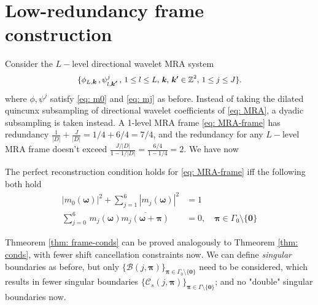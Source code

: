 \section{Low-redundancy frame construction}\label{sec: frame}
Consider the $L-$level directional wavelet MRA system
 \begin{align}\label{eq: MRA-frame}
 \{\phi_{L,\boldsymbol{k}}\,,\psi^j_{l,\boldsymbol{k'}}\,, \, {\small 1\leq l \leq L,\, \boldsymbol{k},\,\boldsymbol{k'}\in \mathbb{Z}^2,\,1\leq j \leq J\}}.
\end{align}  
where $\phi,\psi^j$ satisfy \eqref{eq: m0} and \eqref{eq: mj} as before. Instead of taking the dilated quincunx subsampling of directional wavelet coefficients of  \eqref{eq: MRA}, a dyadic subsampling is taken instead. A 1-level MRA frame \eqref{eq: MRA-frame} has redundancy $\frac{1}{|D|} + \frac{J}{|D|} = 1/4 + 6/4 = 7/4$, and the redundancy for any $L-$level MRA frame doesn't exceed $\frac{J/|D|}{1-1/|D|} = \frac{6/4}{1-1/4} = 2$. 
We have now
\begin{thm}\label{thm: frame-conds}
The perfect reconstruction condition holds for \eqref{eq: MRA-frame} iff the following both hold
\begin{align}
\textstyle |m_0(\boldsymbol{\omega})|^2 + \sum_{j = 1}^6|m_j(\boldsymbol{\omega})|^2 &= 1 \\
\textstyle\sum_{j = 0}^6\,m_j(\boldsymbol{\omega})\overline{m_j(\boldsymbol{\omega} + \boldsymbol{\pi})} &= 0,\quad  \boldsymbol{\pi}\in \Gamma_0\setminus\{\boldsymbol{0}\} \label{eq: reduced-shift-cancel}
\end{align}
\end{thm}
Thmeorem \ref{thm: frame-conds} can be proved analogously to Thmeorem \ref{thm: conds}, 
with fewer shift cancellation constraints now. 
We can define {\it singular} boundaries as before, %
but only $\{\mathcal{B}(j,\boldsymbol{\pi})\}_{\boldsymbol{\pi}\in\Gamma_0\setminus\{\boldsymbol{0}\}}$ need to be considered, which results in fewer singular boundaries $\{\mathcal{C}_s(j,\boldsymbol{\pi})\}_{\boldsymbol{\pi}\in\Gamma\setminus\{\boldsymbol{0}\}}$; 
and no "double" singular boundaries now.

